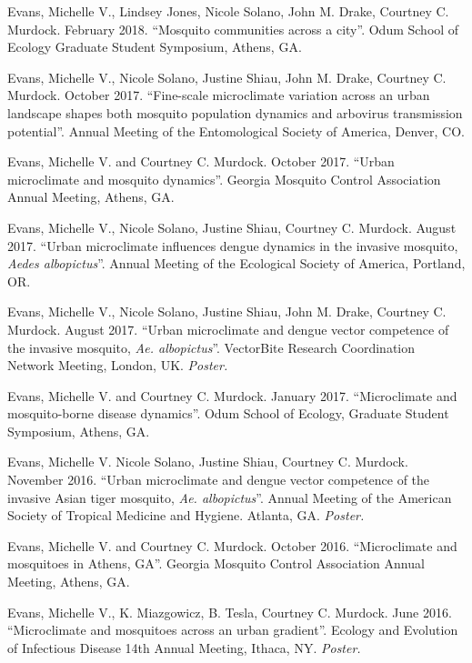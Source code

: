 \begin{cvitems}
	\item Evans, Michelle V., Lindsey Jones, Nicole Solano, John M. Drake, Courtney C. Murdock. February 2018. ``Mosquito communities across a city''. Odum School of Ecology Graduate Student Symposium, Athens, GA.

	\item Evans, Michelle V., Nicole Solano, Justine Shiau, John M. Drake, Courtney C. Murdock. October 2017. ``Fine-scale microclimate variation across an urban landscape shapes both mosquito population dynamics and arbovirus transmission potential''. Annual Meeting of the Entomological Society of America, Denver, CO.

	\item Evans, Michelle V. and Courtney C. Murdock. October 2017. ``Urban microclimate and mosquito dynamics''. Georgia Mosquito Control Association Annual Meeting, Athens, GA.

	\item Evans, Michelle V., Nicole Solano, Justine Shiau, Courtney C. Murdock. August 2017. ``Urban microclimate influences dengue dynamics in the invasive mosquito, \textit{Aedes albopictus}''. Annual Meeting of the Ecological Society of America, Portland, OR.

	\item Evans, Michelle V., Nicole Solano, Justine Shiau, John M. Drake, Courtney C. Murdock. August 2017. ``Urban microclimate and dengue vector competence of the invasive mosquito, \textit{Ae. albopictus}''. VectorBite Research Coordination Network Meeting, London, UK. \textit{Poster.}

	\item Evans, Michelle V. and Courtney C. Murdock. January 2017. ``Microclimate and mosquito-borne disease dynamics''. Odum School of Ecology, Graduate Student Symposium, Athens, GA.

	\item Evans, Michelle V. Nicole Solano, Justine Shiau, Courtney C. Murdock. November 2016. ``Urban microclimate and dengue vector competence of the invasive Asian tiger mosquito, \textit{Ae. albopictus}''. Annual Meeting of the American Society of Tropical Medicine and Hygiene. Atlanta, GA. \textit{Poster.}

	\item Evans, Michelle V. and Courtney C. Murdock. October 2016. ``Microclimate and mosquitoes in Athens, GA''. Georgia Mosquito Control Association Annual Meeting, Athens, GA.

	\item Evans, Michelle V., K. Miazgowicz, B. Tesla, Courtney C. Murdock. June 2016. ``Microclimate and mosquitoes across an urban gradient''. Ecology and Evolution of Infectious Disease 14th Annual Meeting, Ithaca, NY. \textit{Poster.}


\end{cvitems}
